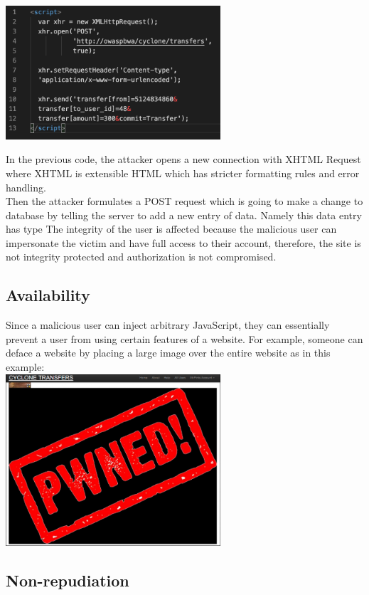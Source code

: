 \documentclass[conference]{IEEEtran}
\begin{document}
\includegraphics[width= 8cm]{ss.png}

In the previous code, the attacker opens a new connection with XHTML Request where XHTML is extensible HTML which has stricter formatting rules and error handling.\\

Then the attacker formulates a POST request which is going to make a change to database by telling the server to add a new entry of data. Namely this data entry has type 
The integrity of the user is affected because the malicious user can impersonate the victim and have full access to their account, therefore, the site is not integrity protected and authorization is not compromised. 

\subsection{Availability}
Since a malicious user can inject arbitrary JavaScript, they can essentially prevent a user from using certain features of a website. For example, someone can deface a website by placing a large image over the entire website as in this example:\\

\includegraphics[width = 8cm]{xss8.png}

\subsection{Non-repudiation}
\end{document}
